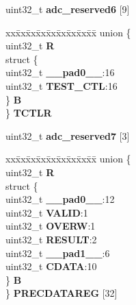 \begin{DoxyCompactItemize}
\begin{tabbing}
\end{tabbing}\item 
\mbox{\label{structADC__tag_abe7cc1a91dafead87fc009437f0269dd}} 
uint32\+\_\+t {\bfseries adc\+\_\+reserved6} \mbox{[}9\mbox{]}
\item 
\mbox{\label{structADC__tag_a0252a1feb94ebffac0b0ad23ebde80a4}} 
\begin{tabbing}
xx\=xx\=xx\=xx\=xx\=xx\=xx\=xx\=xx\=\kill
union \{\\
\>uint32\_t {\bfseries R}\\
\>struct \{\\
\>\>uint32\_t {\bfseries \_\_pad0\_\_}:16\\
\>\>uint32\_t {\bfseries TEST\_CTL}:16\\
\>\} {\bfseries B}\\
\} {\bfseries TCTLR}\\

\end{tabbing}\item 
\mbox{\label{structADC__tag_a216f885747886d261520dc6c09987796}} 
uint32\+\_\+t {\bfseries adc\+\_\+reserved7} \mbox{[}3\mbox{]}
\item 
\mbox{\label{structADC__tag_a0a762417abaf111201551eeb5c18d9a3}} 
\begin{tabbing}
xx\=xx\=xx\=xx\=xx\=xx\=xx\=xx\=xx\=\kill
union \{\\
\>uint32\_t {\bfseries R}\\
\>struct \{\\
\>\>uint32\_t {\bfseries \_\_pad0\_\_}:12\\
\>\>uint32\_t {\bfseries VALID}:1\\
\>\>uint32\_t {\bfseries OVERW}:1\\
\>\>uint32\_t {\bfseries RESULT}:2\\
\>\>uint32\_t {\bfseries \_\_pad1\_\_}:6\\
\>\>uint32\_t {\bfseries CDATA}:10\\
\>\} {\bfseries B}\\
\} {\bfseries PRECDATAREG} \mbox{[}32\mbox{]}\\


\end{tabbing}
\end{DoxyCompactItemize}
